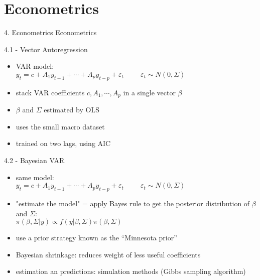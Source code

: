\section{Econometrics}

\begin{frame}{4. Econometrics}
\centering
\Huge{Econometrics}
\end{frame}

\begin{frame}{4.1 - Vector Autoregression}
\begin{itemize}
	\item VAR model: \\ \vspace{2mm}
	$y_t = c + A_1 y_{t-1} + \cdots + A_p y_{t-p} + \varepsilon_t \hspace{1cm} \varepsilon_t \sim N(0, \Sigma)$ \\ \vspace{2mm}
	\item stack VAR coefficients $c, A_1, \cdots, A_p$ in a single vector $\beta$ \vspace{2mm}
	\item $\beta$ and $\Sigma$ estimated by OLS \vspace{2mm}
	\item uses the small macro dataset \vspace{2mm}
	\item trained on two lags, using AIC
\end{itemize}
\end{frame}


\begin{frame}{4.2 - Bayesian VAR}
\begin{itemize}
	\item same model: \\ \vspace{1mm}
	$y_t = c + A_1 y_{t-1} + \cdots + A_p y_{t-p} + \varepsilon_t \hspace{1cm} \varepsilon_t \sim N(0, \Sigma)$ \\ \vspace{1mm}
	\item "estimate the model" = apply Bayes rule to get the posterior distribution of $\beta$ and $\Sigma$: \\ \vspace{1mm}
	$\pi(\beta, \Sigma| y) \propto f(y|\beta, \Sigma) \pi(\beta, \Sigma)$ \vspace{1mm}
	\item use a prior strategy known as the ``Minnesota prior'' \vspace{1mm}
	\item Bayesian shrinkage: reduces weight of less useful coefficients \vspace{1mm}
	\item estimation an predictions: simulation methods (Gibbs sampling algorithm)
\end{itemize}
\end{frame}


